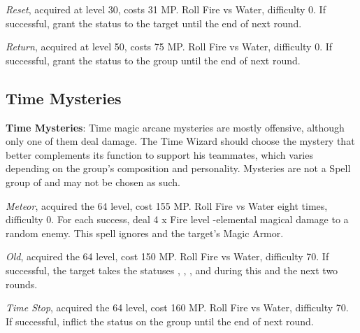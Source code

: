 \begin{multicols}{2}
    \textit{Reset}, acquired at level 30, costs 31 MP\@. Roll Fire vs Water, difficulty 0. If successful, grant the  status to the target until the end of next round.
    
    \textit{Return}, acquired at level 50, costs 75 MP\@. Roll Fire vs Water, difficulty 0. If successful, grant the  status to the group until the end of next round.
    
    \subsection{Time Mysteries}\label{subsec:time-mysteries}

    \textbf{Time Mysteries}: Time magic arcane mysteries are mostly offensive, although only one of them deal damage. The Time Wizard should choose the mystery that better complements its function to support his teammates, which varies depending on the group’s composition and personality. Mysteries are not a Spell group of and may not be chosen as such.
    
    \textit{Meteor}, acquired the 64 level, cost 155 MP\@. Roll Fire vs Water eight times, difficulty 0. For each success, deal 4 x Fire level -elemental magical damage to a random enemy. This spell ignores  and the target’s Magic Armor.
    
    \textit{Old}, acquired the 64 level, cost 150 MP\@. Roll Fire vs Water, difficulty 70. If successful, the target takes the statuses , , ,  and  during this and the next two rounds.
    
    \textit{Time Stop}, acquired the 64 level, cost 160 MP\@. Roll Fire vs Water, difficulty 70. If successful, inflict the  status on the group until the end of next round.

\end{multicols}

